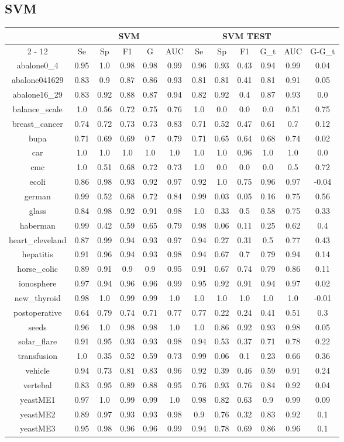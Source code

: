 \documentclass{article}%
\begin{document}
%
\subsection*{SVM}%
\begin{tabular}{|c|c|c|c|c|c|c|c|c|c|c|c|}%
\hline%
&\multicolumn{5}{|c|}{SVM}&\multicolumn{5}{|c|}{SVM TEST}&\\%
\cline{2%
-%
12}%
&Se&Sp&F1&G&AUC&Se&Sp&F1&G\_t&AUC&G{-}G\_t\\%
\hline%
abalone0\_4&0.95&1.0&0.98&0.98&0.99&0.96&0.93&0.43&0.94&0.99&0.04\\%
abalone041629&0.83&0.9&0.87&0.86&0.93&0.81&0.81&0.41&0.81&0.91&0.05\\%
abalone16\_29&0.83&0.92&0.88&0.87&0.94&0.82&0.92&0.4&0.87&0.93&0.0\\%
balance\_scale&1.0&0.56&0.72&0.75&0.76&1.0&0.0&0.0&0.0&0.51&0.75\\%
breast\_cancer&0.74&0.72&0.73&0.73&0.83&0.71&0.52&0.47&0.61&0.7&0.12\\%
bupa&0.71&0.69&0.69&0.7&0.79&0.71&0.65&0.64&0.68&0.74&0.02\\%
car&1.0&1.0&1.0&1.0&1.0&1.0&1.0&0.96&1.0&1.0&0.0\\%
cmc&1.0&0.51&0.68&0.72&0.73&1.0&0.0&0.0&0.0&0.5&0.72\\%
ecoli&0.86&0.98&0.93&0.92&0.97&0.92&1.0&0.75&0.96&0.97&{-}0.04\\%
german&0.99&0.52&0.68&0.72&0.84&0.99&0.03&0.05&0.16&0.75&0.56\\%
glass&0.84&0.98&0.92&0.91&0.98&1.0&0.33&0.5&0.58&0.75&0.33\\%
haberman&0.99&0.42&0.59&0.65&0.79&0.98&0.06&0.11&0.25&0.62&0.4\\%
heart\_cleveland&0.87&0.99&0.94&0.93&0.97&0.94&0.27&0.31&0.5&0.77&0.43\\%
hepatitis&0.91&0.96&0.94&0.93&0.98&0.94&0.67&0.7&0.79&0.94&0.14\\%
horse\_colic&0.89&0.91&0.9&0.9&0.95&0.91&0.67&0.74&0.79&0.86&0.11\\%
ionosphere&0.97&0.94&0.96&0.96&0.99&0.95&0.92&0.91&0.94&0.97&0.02\\%
new\_thyroid&0.98&1.0&0.99&0.99&1.0&1.0&1.0&1.0&1.0&1.0&{-}0.01\\%
postoperative&0.64&0.79&0.74&0.71&0.77&0.77&0.22&0.24&0.41&0.51&0.3\\%
seeds&0.96&1.0&0.98&0.98&1.0&1.0&0.86&0.92&0.93&0.98&0.05\\%
solar\_flare&0.91&0.95&0.93&0.93&0.98&0.94&0.53&0.37&0.71&0.78&0.22\\%
transfusion&1.0&0.35&0.52&0.59&0.73&0.99&0.06&0.1&0.23&0.66&0.36\\%
vehicle&0.94&0.73&0.81&0.83&0.96&0.92&0.39&0.46&0.59&0.91&0.24\\%
vertebal&0.83&0.95&0.89&0.88&0.95&0.76&0.93&0.76&0.84&0.92&0.04\\%
yeastME1&0.97&1.0&0.99&0.99&1.0&0.98&0.82&0.63&0.9&0.99&0.09\\%
yeastME2&0.89&0.97&0.93&0.93&0.98&0.9&0.76&0.32&0.83&0.92&0.1\\%
yeastME3&0.95&0.98&0.96&0.96&0.99&0.94&0.78&0.69&0.86&0.96&0.1\\%
\hline%
\end{tabular}
\end{document}
